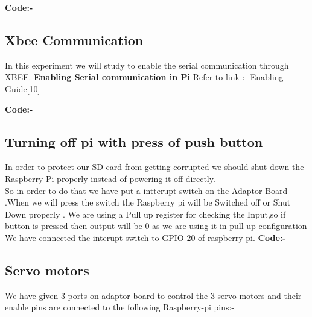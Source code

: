 \documentclass[11pt,a4paper]{report}
\begin{document}
\begin{flushleft}
\begin{tabular}{ |p{3cm}|p{3cm}| }
\end{tabular}
			\newpage
	\flushleft
	\textbf{Code:-}
	\vspace{0.3cm}
	
	\newpage
	
	
	    \subsection{Xbee Communication}
	    
	    In this experiment we will study to enable the serial communication through XBEE.  \vspace{0.3cm}\newline
	     \textbf{Enabling Serial communication in Pi}\newline
	     Refer to link :- \href{https://electrosome.com/uart-raspberry-pi-python/}{Enabling Guide[10]}
	    \vspace{0.2cm} \newline
	    
	    \flushleft
	\textbf{Code:-}
	
	
	\newpage
	\subsection{Turning off pi with press of push button}
	In order to protect our SD card from getting corrupted we should shut down the Raspberry-Pi properly instead of powering it off directly.\\
	So in order to do that we have put a intterupt switch on the Adaptor Board .When we will press the switch the Raspberry pi will be Switched off or Shut Down properly .
	We are using a Pull up register for checking the Input,so if button is pressed then output will be 0 as we are using it in pull up configuration \\
	We have connected the interupt switch to GPIO 20 of raspberry pi.
	\vspace{0.2cm} \newline
	    \flushleft
	\textbf{Code:-}
	
	\newpage
	\subsection{Servo motors}
	We have given 3 ports on adaptor board to control the 3 servo motors and their enable pins are connected to the following Raspberry-pi pins:-
	
	\centering
	\begin{tabular}{ |p{3cm}|p{3cm}| }


\end{tabular}
\end{flushleft}
\end{document}
